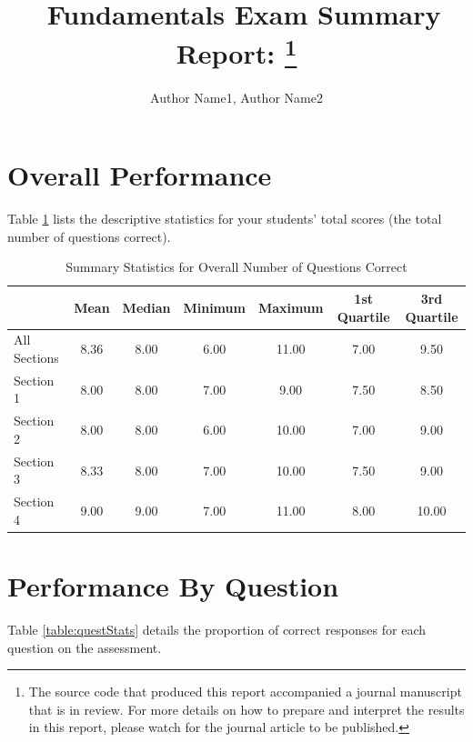 \documentclass[11pt,letterpaper]{article}\usepackage[]{graphicx}\usepackage[]{color}
\author{Author Name1, Author Name2}
\title{\ClassNumber~Fundamentals Exam Summary Report: \SemYear \thanks{The source code that produced this report accompanied a journal manuscript that is in review.  For more details on how to prepare and interpret the results in this report, please watch for the journal article to be published.}}
\begin{document}
\maketitle















\section*{Overall Performance}
Table \ref{table:summaryStats} lists the descriptive statistics for your students' total scores (the total number of questions correct). 
\begin{table}[ht]
\centering
\caption{Summary Statistics for Overall Number of Questions Correct} 
\label{table:summaryStats}
\begin{tabular}{lcccccc}
  \toprule
 & Mean & Median & Minimum & Maximum & 1st Quartile & 3rd Quartile \\ 
  \midrule
All Sections & 8.36 & 8.00 & 6.00 & 11.00 & 7.00 & 9.50 \\ 
  Section 1 & 8.00 & 8.00 & 7.00 & 9.00 & 7.50 & 8.50 \\ 
  Section 2 & 8.00 & 8.00 & 6.00 & 10.00 & 7.00 & 9.00 \\ 
  Section 3 & 8.33 & 8.00 & 7.00 & 10.00 & 7.50 & 9.00 \\ 
  Section 4 & 9.00 & 9.00 & 7.00 & 11.00 & 8.00 & 10.00 \\ 
   \bottomrule
\end{tabular}
\end{table}

\FloatBarrier

\section*{Performance By Question}
Table \ref{table:questStats} details the proportion of correct responses for each question on the assessment.  
\end{document}

